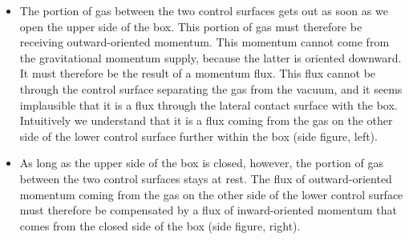 \documentclass[a4paper,12pt,%
onecolumn,oneside,%
british%
]{memoir}
\renewcommand*{\|}[1][]{\nonscript\:#1\vert\nonscript\:\mathopen{}}
\begin{document}
\begin{itemize}
\item The portion of gas between the two control surfaces gets out as soon as we open the upper side of the box. This portion of gas must therefore be receiving outward-oriented momentum. This momentum cannot come from the gravitational momentum supply, because the latter is oriented downward. It must therefore be the result of a momentum flux. This flux cannot be through the control surface separating the gas from the vacuum, and it seems implausible that it is a flux through the lateral contact surface with the box. Intuitively we understand that it is a flux coming from the gas on the other side of the lower control surface further within the box (side figure, left).
\item As long as the upper side of the box is closed, however, the portion of gas between the two control surfaces stays at rest. The flux of outward-oriented momentum coming from the gas on the other side of the lower control surface must therefore be compensated by a flux of inward-oriented momentum that comes from the closed side of the box (side figure, right).
\end{itemize}
\end{document}
